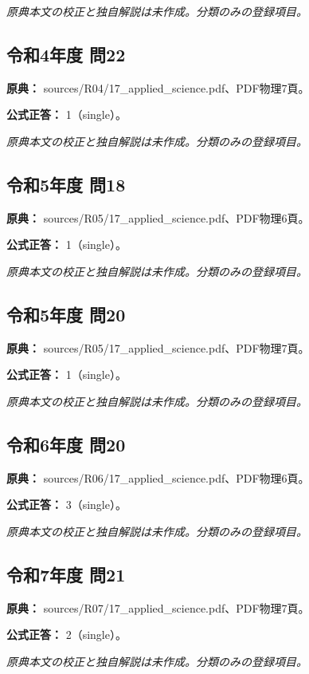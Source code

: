 \par\textit{原典本文の校正と独自解説は未作成。分類のみの登録項目。}

\subsection{令和4年度 問22}
\label{q:r04-reg-applied-22}

\noindent\textbf{原典：} sources/R04/17\_applied\_science.pdf、PDF物理7頁。

\textbf{公式正答：} 1（single）。

\par\textit{原典本文の校正と独自解説は未作成。分類のみの登録項目。}

\subsection{令和5年度 問18}
\label{q:r05-reg-applied-18}

\noindent\textbf{原典：} sources/R05/17\_applied\_science.pdf、PDF物理6頁。

\textbf{公式正答：} 1（single）。

\par\textit{原典本文の校正と独自解説は未作成。分類のみの登録項目。}

\subsection{令和5年度 問20}
\label{q:r05-reg-applied-20}

\noindent\textbf{原典：} sources/R05/17\_applied\_science.pdf、PDF物理7頁。

\textbf{公式正答：} 1（single）。

\par\textit{原典本文の校正と独自解説は未作成。分類のみの登録項目。}

\subsection{令和6年度 問20}
\label{q:r06-reg-applied-20}

\noindent\textbf{原典：} sources/R06/17\_applied\_science.pdf、PDF物理6頁。

\textbf{公式正答：} 3（single）。

\par\textit{原典本文の校正と独自解説は未作成。分類のみの登録項目。}

\subsection{令和7年度 問21}
\label{q:r07-reg-applied-21}

\noindent\textbf{原典：} sources/R07/17\_applied\_science.pdf、PDF物理7頁。

\textbf{公式正答：} 2（single）。

\par\textit{原典本文の校正と独自解説は未作成。分類のみの登録項目。}
